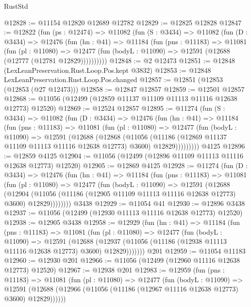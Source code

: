 \begin{lexlean}{RustStd}
\begin{coremodule}
@12828 := @11154 @12820 @12689 @12782
@12829 := @12825 @12828
@12847 := @12822
    (fun (ps : @12474) =>
    @11082
      (fun (S : @3434) =>
      @11082
        (fun (D : @3434) =>
        @12476
          (fun (hn : @41) =>
          @11184
            (fun (pns : @11183) =>
            @11081
              (fun (pl : @11080) =>
              @12477 (fun (bodyL : @11090) => @12591 (@12688 (@12777 (@12781 @12829))))))))))
@12848 := @2 @12473
@12851 := @12848 (LexLeanPreservation.Rust.Loop.Pos.kept @3832)
@12853 := @12848 LexLeanPreservation.Rust.Loop.Pos.changed
@12857 := @12851 (@12853 (@12853 (@27 @12473)))
@12858 := @12847 @12857
@12859 := @12501 @12857
@12868 := @11056 (@12499 (@12859 @11137 @11109 @11113 @11116 @12638 @12773) @12520)
@12869 := @12524 @12857
@12895 := @11274
    (fun (S : @3434) =>
    @11082
      (fun (D : @3434) =>
      @12476
        (fun (hn : @41) =>
        @11184
          (fun (pns : @11183) =>
          @11081
            (fun (pl : @11080) =>
            @12477
              (fun (bodyL : @11090) =>
              @12591
                (@12688
                  (@12868
                    (@11056
                      (@11186 (@12869 @11137 @11109 @11113 @11116 @12638 @12773) @3600)
                      @12829)))))))))
    @4125
@12896 := @12859 @4125
@12904 := @11056 (@12499 (@12896 @11109 @11113 @11116 @12638 @12773) @12520)
@12905 := @12869 @4125
@12928 := @11274
    (fun (D : @3434) =>
    @12476
      (fun (hn : @41) =>
      @11184
        (fun (pns : @11183) =>
        @11081
          (fun (pl : @11080) =>
          @12477
            (fun (bodyL : @11090) =>
            @12591
              (@12688
                (@12904
                  (@11056 (@11186 (@12905 @11109 @11113 @11116 @12638 @12773) @3600) @12829))))))))
    @3438
@12929 := @11054 @41
@12930 := @12896 @3438
@12937 := @11056 (@12499 (@12930 @11113 @11116 @12638 @12773) @12520)
@12938 := @12905 @3438
@12958 := @12929
    (fun (hn : @41) =>
    @11184
      (fun (pns : @11183) =>
      @11081
        (fun (pl : @11080) =>
        @12477
          (fun (bodyL : @11090) =>
          @12591
            (@12688
              (@12937 (@11056 (@11186 (@12938 @11113 @11116 @12638 @12773) @3600) @12829)))))))
    @201
@12959 := @11054 @11183
@12960 := @12930 @201
@12966 := @11056 (@12499 (@12960 @11116 @12638 @12773) @12520)
@12967 := @12938 @201
@12983 := @12959
    (fun (pns : @11183) =>
    @11081
      (fun (pl : @11080) =>
      @12477
        (fun (bodyL : @11090) =>
        @12591 (@12688 (@12966 (@11056 (@11186 (@12967 @11116 @12638 @12773) @3600) @12829))))))

\end{coremodule}
\end{lexlean}
